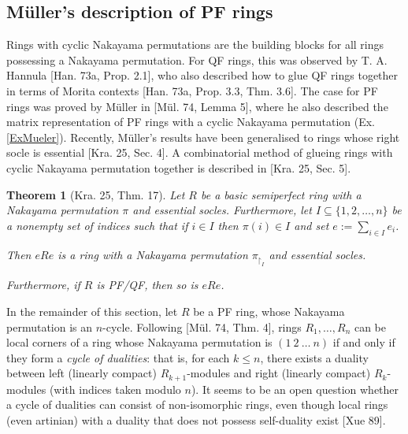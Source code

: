 \documentclass[11pt]{article}
\theoremstyle{plain}
\newtheorem{Thm}[veta]{Theorem}
\theoremstyle{remark}
\theoremstyle{plain}
\begin{document}
\subsection{Müller's description of PF rings} \label{SecMueller}

Rings with cyclic Nakayama permutations are the building blocks for all rings possessing a Nakayama permutation. For QF rings, this was observed by T. A. Hannula [Han. 73a,  Prop. 2.1], who also described how to glue QF rings together in terms of Morita contexts [Han. 73a, Prop. 3.3, Thm. 3.6]. The case for PF rings was proved by Müller in [Mül. 74, Lemma 5], where he also described the matrix representation of PF rings with a cyclic Nakayama permutation (Ex. \ref{ExMueler}). Recently, Müller's results have been generalised to rings whose right socle is essential [Kra. 25, Sec. 4]. A combinatorial method of glueing rings with cyclic Nakayama permutation together is described in [Kra. 25, Sec. 5].

\begin{Thm}[Kra. 25, Thm. 17]\label{ThmCycle}
      Let $R$ be a basic semiperfect ring with a Nakayama permutation $\pi$ and essential socles. Furthermore, let $I\subseteq \{1,2,\dots, n\}$ be a nonempty set of indices such that if $i\in I$ then $\pi(i)\in I$ and set $e:=\sum_{i\in I}e_i$. 

    Then $eRe$ is a ring with a Nakayama permutation $\pi_{\restriction_I}$ and essential socles.

    Furthermore, if $R$ is PF/QF, then so is $eRe$.
\end{Thm}

 In the remainder of this section, let $R$ be a PF ring, whose Nakayama permutation is an $n$-cycle. Following [Mül. 74, Thm. 4],  rings $R_1, \dots, R_n$ can be local corners of a ring whose Nakayama permutation is $(1~2~\dots~n)$ if and only if they form a \textit{cycle of dualities}: that is, for each $k\leq n$, there exists a duality between left (linearly compact) $R_{k+1}$-modules and right (linearly compact) $R_k$-modules (with indices taken modulo $n$).  It seems to be an open question whether a cycle of dualities can consist of non-isomorphic rings, even though local rings (even artinian) with a duality that does not possess self-duality exist [Xue 89].
\end{document}
